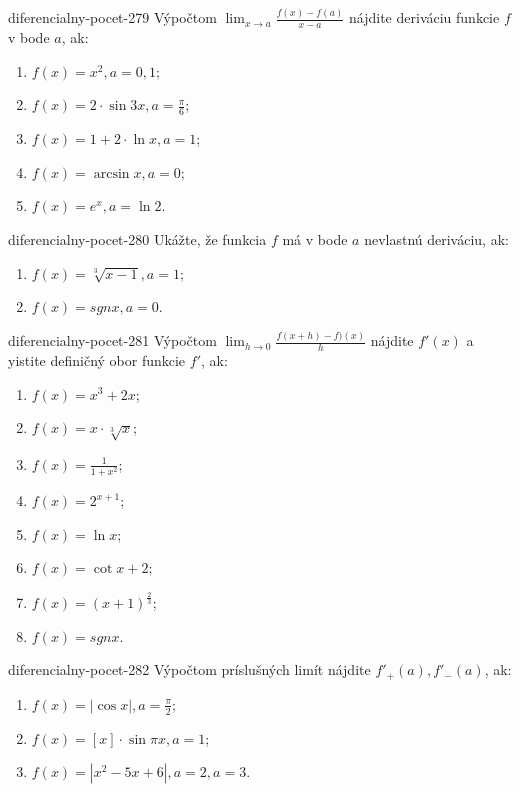 \begin{defproblem}{diferencialny-pocet-279}
Výpočtom $\lim_{x \rightarrow a}\frac{f(x)-f(a)}{x-a}$ nájdite deriváciu funkcie $f$ v bode $a$, ak:
\begin{multicols}{2}
\begin{enumerate}
    \item $f(x)=x^2,a=0,1$;
    \item $f(x)=2\cdot \sin 3x,a=\frac{\pi}{6}$;
    \item $f(x)=1+2\cdot \ln x,a=1$;
    \item $f(x)=\arcsin x,a=0$;
    \item $f(x)=e^x,a=\ln 2$.
\end{enumerate}
\end{multicols}
\end{defproblem}

\begin{defproblem}{diferencialny-pocet-280}
Ukážte, že funkcia $f$ má v bode $a$ nevlastnú deriváciu, ak:
\begin{enumerate}
\item $f(x)=\sqrt[3]{x-1},a=1$;
\item $f(x)=sgn x,a=0$.
\end{enumerate}
\end{defproblem}

\begin{defproblem}{diferencialny-pocet-281}
Výpočtom $\lim_{h \rightarrow 0}\frac{f(x+h)-f)(x)}{h}$ nájdite $f'(x)$ a yistite definičný obor funkcie $f'$, ak:
\begin{multicols}{2}
\begin{enumerate}
   \item $f(x)=x^3+2x$;
   \item $f(x)=x\cdot \sqrt[3]{x}$;
   \item $f(x)=\frac{1}{1+x^2}$;
   \item $f(x)=2^{x+1}$;
   \item $f(x)=\ln x$;
   \item $f(x)=\cot x+2$;
   \item $f(x)=(x+1)^{\frac{2}{3}}$;
   \item $f(x)=sgn x$.
\end{enumerate}
\end{multicols}
\end{defproblem}

\begin{defproblem}{diferencialny-pocet-282}
Výpočtom príslušných limít nájdite $f'_+(a),f'_-(a)$, ak:
\begin{enumerate}
\item $f(x)=|\cos x|,a=\frac{\pi}{2}$;
\item $f(x)=[x]\cdot \sin \pi x,a=1$;
\item $f(x)=|x^2-5x+6|,a=2,a=3$.
\end{enumerate}
\end{defproblem}

